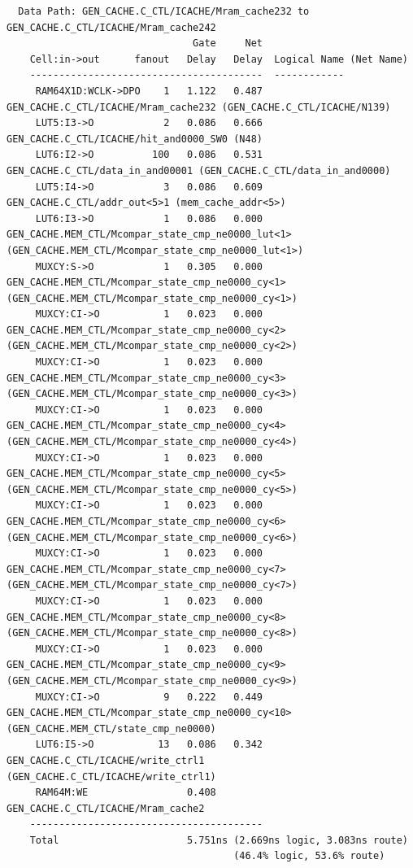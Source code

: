\documentclass[11pt,letterpaper,]{article}
\begin{document}
\begin{tiny}
\begin{verbatim}
  Data Path: GEN_CACHE.C_CTL/ICACHE/Mram_cache232 to GEN_CACHE.C_CTL/ICACHE/Mram_cache242
                                Gate     Net
    Cell:in->out      fanout   Delay   Delay  Logical Name (Net Name)
    ----------------------------------------  ------------
     RAM64X1D:WCLK->DPO    1   1.122   0.487  GEN_CACHE.C_CTL/ICACHE/Mram_cache232 (GEN_CACHE.C_CTL/ICACHE/N139)
     LUT5:I3->O            2   0.086   0.666  GEN_CACHE.C_CTL/ICACHE/hit_and0000_SW0 (N48)
     LUT6:I2->O          100   0.086   0.531  GEN_CACHE.C_CTL/data_in_and00001 (GEN_CACHE.C_CTL/data_in_and0000)
     LUT5:I4->O            3   0.086   0.609  GEN_CACHE.C_CTL/addr_out<5>1 (mem_cache_addr<5>)
     LUT6:I3->O            1   0.086   0.000  GEN_CACHE.MEM_CTL/Mcompar_state_cmp_ne0000_lut<1> (GEN_CACHE.MEM_CTL/Mcompar_state_cmp_ne0000_lut<1>)
     MUXCY:S->O            1   0.305   0.000  GEN_CACHE.MEM_CTL/Mcompar_state_cmp_ne0000_cy<1> (GEN_CACHE.MEM_CTL/Mcompar_state_cmp_ne0000_cy<1>)
     MUXCY:CI->O           1   0.023   0.000  GEN_CACHE.MEM_CTL/Mcompar_state_cmp_ne0000_cy<2> (GEN_CACHE.MEM_CTL/Mcompar_state_cmp_ne0000_cy<2>)
     MUXCY:CI->O           1   0.023   0.000  GEN_CACHE.MEM_CTL/Mcompar_state_cmp_ne0000_cy<3> (GEN_CACHE.MEM_CTL/Mcompar_state_cmp_ne0000_cy<3>)
     MUXCY:CI->O           1   0.023   0.000  GEN_CACHE.MEM_CTL/Mcompar_state_cmp_ne0000_cy<4> (GEN_CACHE.MEM_CTL/Mcompar_state_cmp_ne0000_cy<4>)
     MUXCY:CI->O           1   0.023   0.000  GEN_CACHE.MEM_CTL/Mcompar_state_cmp_ne0000_cy<5> (GEN_CACHE.MEM_CTL/Mcompar_state_cmp_ne0000_cy<5>)
     MUXCY:CI->O           1   0.023   0.000  GEN_CACHE.MEM_CTL/Mcompar_state_cmp_ne0000_cy<6> (GEN_CACHE.MEM_CTL/Mcompar_state_cmp_ne0000_cy<6>)
     MUXCY:CI->O           1   0.023   0.000  GEN_CACHE.MEM_CTL/Mcompar_state_cmp_ne0000_cy<7> (GEN_CACHE.MEM_CTL/Mcompar_state_cmp_ne0000_cy<7>)
     MUXCY:CI->O           1   0.023   0.000  GEN_CACHE.MEM_CTL/Mcompar_state_cmp_ne0000_cy<8> (GEN_CACHE.MEM_CTL/Mcompar_state_cmp_ne0000_cy<8>)
     MUXCY:CI->O           1   0.023   0.000  GEN_CACHE.MEM_CTL/Mcompar_state_cmp_ne0000_cy<9> (GEN_CACHE.MEM_CTL/Mcompar_state_cmp_ne0000_cy<9>)
     MUXCY:CI->O           9   0.222   0.449  GEN_CACHE.MEM_CTL/Mcompar_state_cmp_ne0000_cy<10> (GEN_CACHE.MEM_CTL/state_cmp_ne0000)
     LUT6:I5->O           13   0.086   0.342  GEN_CACHE.C_CTL/ICACHE/write_ctrl1 (GEN_CACHE.C_CTL/ICACHE/write_ctrl1)
     RAM64M:WE                 0.408          GEN_CACHE.C_CTL/ICACHE/Mram_cache2
    ----------------------------------------
    Total                      5.751ns (2.669ns logic, 3.083ns route)
                                       (46.4% logic, 53.6% route)
\end{verbatim}
\end{tiny}
\end{document}
